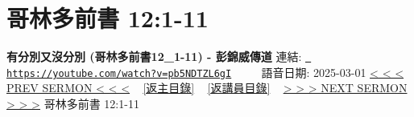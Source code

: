 \documentclass{book}
\begin{document}
\section{哥林多前書 12:1-11}
\label{sec:pb5NDTZL6gI}
\textbf{有分別又沒分別 (哥林多前書12\_1-11) - 彭錦威傳道}
\newline
\newline
連結: \href{https://youtube.com/watch?v=pb5NDTZL6gI}{\texttt{ https://youtube.com/watch?v=pb5NDTZL6gI}} ~~~~ 語音日期: 2025-03-01 
\newline
\newline
\hyperref[sec:Ii_o05jkhEI]{< < < PREV SERMON < < <}
~
\hyperlink{toc}{[返主目錄]}
~
\hyperref[ch:preacher3]{[返講員目錄]}
~
\hyperref[sec:Y_0n0vkhyDU]{> > > NEXT SERMON > > >}
\newline
\newline
哥林多前書 12:1-11
\newline
\end{document}

